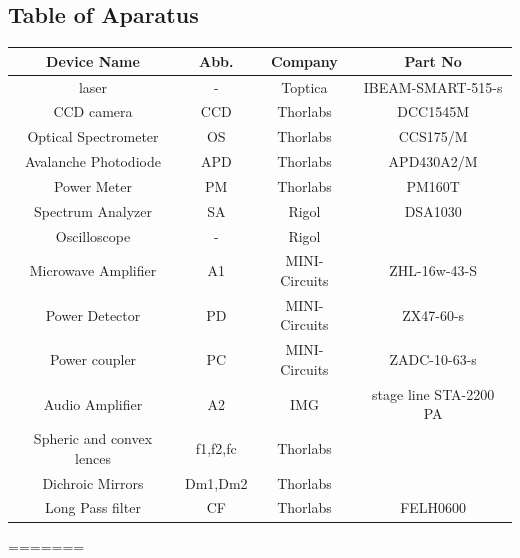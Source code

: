  \subsection{Table of Aparatus}
 
 \begin{tabular}{|c|c|c|c|}
 	\hline 
 	Device Name & Abb. & Company & Part No \\ 
 	\hline 
 	laser & - & Toptica & IBEAM-SMART-515-s  \\ 
 	\hline 
 	CCD camera & CCD & Thorlabs &  DCC1545M\\ 
 	\hline 
 	Optical Spectrometer & OS & Thorlabs & CCS175/M \\ 
 	\hline 
 	Avalanche Photodiode & APD & Thorlabs & APD430A2/M \\ 
 	\hline 
 	Power Meter & PM & Thorlabs & PM160T \\ 
 	\hline 
 	Spectrum Analyzer & SA & Rigol & DSA1030 \\ 
 	\hline 
 	Oscilloscope & - & Rigol &  \\ 
 	\hline 
 	Microwave Amplifier & A1 & MINI-Circuits & ZHL-16w-43-S \\ 
 	\hline 
 	Power Detector & PD &MINI-Circuits  & ZX47-60-s  \\ 
 	\hline 
 	Power coupler  & PC &MINI-Circuits  & ZADC-10-63-s \\ 
 	\hline 
 	Audio Amplifier & A2 & IMG &  stage line STA-2200 PA \\ 
 	\hline 
 	Spheric and convex lences & f1,f2,fc & Thorlabs  &  \\ 
 	\hline 
 	Dichroic Mirrors & Dm1,Dm2 & Thorlabs &  \\ 
 	\hline 
 		Long Pass filter & CF & Thorlabs & FELH0600  \\ 
 	\hline 
 \end{tabular} 
=======
